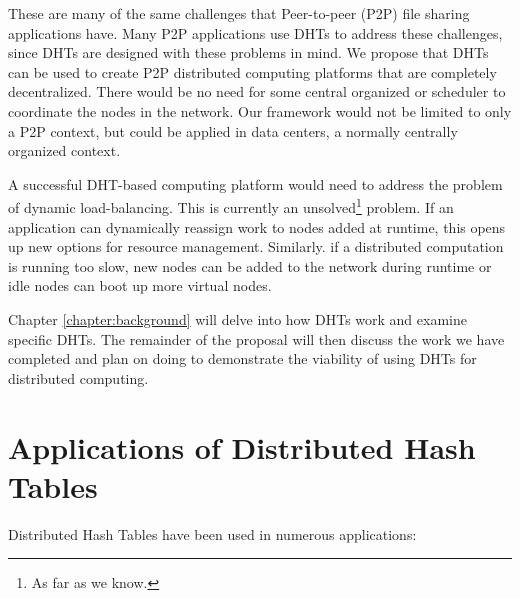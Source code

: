 These are many of the same challenges that Peer-to-peer (P2P) file sharing applications have.
Many P2P applications use DHTs to address these challenges, since DHTs are designed with these problems in mind.
We propose that DHTs can be used to create P2P distributed computing platforms that are completely decentralized.
There would be no need for some central organized or scheduler to coordinate the nodes in the network.
Our framework would not be limited to only a P2P context, but could be applied in data centers, a normally centrally organized context.


A successful DHT-based computing platform would need to address the problem of dynamic load-balancing.
This is currently an unsolved\footnote{As far as we know.} problem. %
If an application can dynamically reassign work to nodes added at runtime, this opens up new options for resource management.
Similarly. if a distributed computation  is running too slow, new nodes can be added to the network during runtime or idle nodes can boot up more virtual nodes. %

Chapter \ref{chapter:background} will delve into how DHTs work and examine specific DHTs.
The remainder of the proposal will then discuss the work we have completed and plan on doing to demonstrate the viability of using DHTs for distributed computing.




\section{Applications of Distributed Hash Tables}

Distributed Hash Tables have been used in numerous applications:

